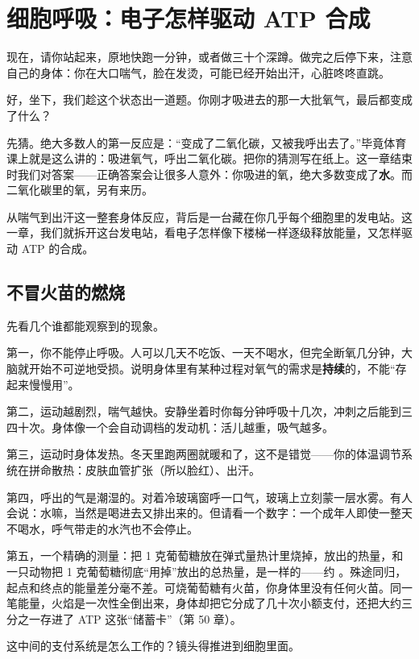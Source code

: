 \chapter{细胞呼吸：电子怎样驱动 ATP 合成}

\begin{kaichang}
现在，请你站起来，原地快跑一分钟，或者做三十个深蹲。做完之后停下来，注意自己的身体：你在大口喘气，脸在发烫，可能已经开始出汗，心脏咚咚直跳。

好，坐下，我们趁这个状态出一道题。你刚才吸进去的那一大批氧气，最后都变成了什么？

先猜。绝大多数人的第一反应是：“变成了二氧化碳，又被我呼出去了。”毕竟体育课上就是这么讲的：吸进氧气，呼出二氧化碳。把你的猜测写在纸上。这一章结束时我们对答案——正确答案会让很多人意外：你吸进的氧，绝大多数变成了\textbf{水}。而二氧化碳里的氧，另有来历。

从喘气到出汗这一整套身体反应，背后是一台藏在你几乎每个细胞里的发电站。这一章，我们就拆开这台发电站，看电子怎样像下楼梯一样逐级释放能量，又怎样驱动 ATP 的合成。
\end{kaichang}

\section{不冒火苗的燃烧}

先看几个谁都能观察到的现象。

第一，你不能停止呼吸。人可以几天不吃饭、一天不喝水，但完全断氧几分钟，大脑就开始不可逆地受损。说明身体里有某种过程对氧气的需求是\textbf{持续}的，不能“存起来慢慢用”。

第二，运动越剧烈，喘气越快。安静坐着时你每分钟呼吸十几次，冲刺之后能到三四十次。身体像一个会自动调档的发动机：活儿越重，吸气越多。

第三，运动时身体发热。冬天里跑两圈就暖和了，这不是错觉——你的体温调节系统在拼命散热：皮肤血管扩张（所以脸红）、出汗。

第四，呼出的气是潮湿的。对着冷玻璃窗呼一口气，玻璃上立刻蒙一层水雾。有人会说：水嘛，当然是喝进去又排出来的。但请看一个数字：一个成年人即使一整天不喝水，呼气带走的水汽也不会停止。

第五，一个精确的测量：把 1 克葡萄糖放在弹式量热计里烧掉，放出的热量，和一只动物把 1 克葡萄糖彻底“用掉”放出的总热量，是一样的——约 。殊途同归，起点和终点的能量差分毫不差。可烧葡萄糖有火苗，你身体里没有任何火苗。同一笔能量，火焰是一次性全倒出来，身体却把它分成了几十次小额支付，还把大约三分之一存进了 ATP 这张“储蓄卡”（第 50 章）。

这中间的支付系统是怎么工作的？镜头得推进到细胞里面。

